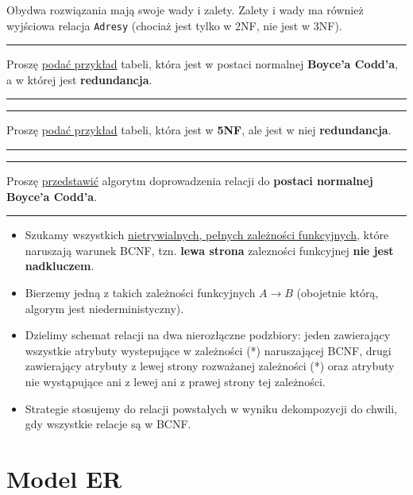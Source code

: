 \documentclass[a5paper,6pt]{article}
\newcommand{\horrule}[1]{\rule{\linewidth}{#1}}
\begin{document}
    Obydwa rozwiązania mają swoje wady i zalety. Zalety i wady ma również
    wyjściowa relacja \texttt{Adresy} (chociaż jest tylko w 2NF, nie jest w
    3NF).

\pagebreak

    \horrule{0.5pt}
    Proszę \underline{podać przykład} tabeli, która jest w postaci normalnej
    \textbf{Boyce’a Codd’a}, a w której jest \textbf{redundancja}.\\
    \horrule{0.5pt}

\pagebreak

    \horrule{0.5pt}
    Proszę \underline{podać przykład} tabeli, która jest w \textbf{5NF},
    ale jest w niej \textbf{redundancja}.\\
    \horrule{0.5pt}

\pagebreak

    \horrule{0.5pt}
    Proszę \underline{przedstawić} algorytm doprowadzenia relacji do
    \textbf{postaci normalnej Boyce’a Codd’a}.\\
    \horrule{0.5pt}

    \begin{itemize}
        \item Szukamy wszystkich \underline{nietrywialnych, pełnych zależności
              funkcyjnych}, które naruszają warunek BCNF, tzn.
              \textbf{lewa strona} zalezności funkcyjnej
              \textbf{nie jest nadkluczem}.
        \item Bierzemy jedną z takich zależności funkcyjnych $A \rightarrow B$
              (obojetnie którą, algorym jest niederministyczny).
        \item Dzielimy schemat relacji na dwa nierozłączne podzbiory:
              jeden zawierający wszystkie atrybuty wystepujące w zależności (*)
              naruszającej BCNF,
              drugi zawierający atrybuty z lewej strony rozważanej zależności
              (*) oraz atrybuty nie wystąpujące ani z lewej ani z prawej strony
              tej zależności.
        \item Strategie stosujemy do relacji powstałych w wyniku dekompozycji
              do chwili, gdy wszystkie relacje są w BCNF.
    \end{itemize}


\pagebreak

    \section{Model ER} %
    \label{sec:model_er}
\end{document}
